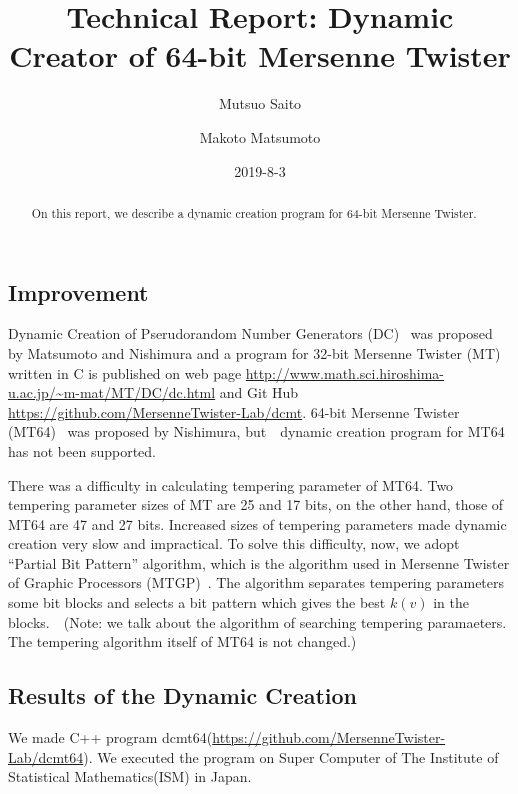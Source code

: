 \documentclass{article}
\title{Technical Report: Dynamic Creator of 64-bit Mersenne Twister}
\author{Mutsuo Saito \and Makoto Matsumoto}
\date{2019-8-3}
\begin{document}
\maketitle

\begin{abstract}
  On this report, we describe a dynamic creation program for 64-bit
  Mersenne Twister.
\end{abstract}



\subsection*{Improvement}

Dynamic Creation of Pserudorandom Number Generators (DC)~\cite{DC} was
proposed by Matsumoto and Nishimura and a program for 32-bit Mersenne
Twister (MT)~\cite{MT} written in C is published on web page
\url{http://www.math.sci.hiroshima-u.ac.jp/~m-mat/MT/DC/dc.html} and
Git Hub \url{https://github.com/MersenneTwister-Lab/dcmt}.  64-bit
Mersenne Twister (MT64)~\cite{MT64} was proposed by Nishimura,
but　dynamic creation program for MT64 has not been supported.

There was a difficulty in calculating tempering parameter of MT64.
Two tempering parameter sizes of MT are 25 and 17 bits, on the other
hand, those of MT64 are 47 and 27 bits.  Increased sizes of tempering
parameters made dynamic creation very slow and impractical. To solve
this difficulty, now, we adopt ``Partial Bit Pattern'' algorithm,
which is the algorithm used in Mersenne Twister of Graphic Processors
(MTGP)~\cite{MTGP}.  The algorithm separates tempering parameters some
bit blocks and selects a bit pattern which gives the best $k(v)$ in
the blocks.　(Note: we talk about the algorithm of searching tempering
paramaeters. The tempering algorithm itself of MT64 is not changed.)

\subsection*{Results of the Dynamic Creation}

We made C++ program
dcmt64(\url{https://github.com/MersenneTwister-Lab/dcmt64}).  We
executed the program on Super Computer of The Institute of Statistical
Mathematics(ISM) in Japan.
\end{document}
